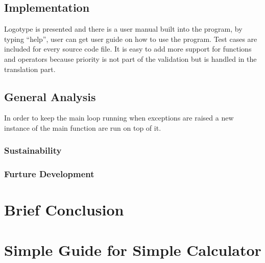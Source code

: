 \documentclass[12pt,a4paper]{article}
\begin{document}
\iffalse
Smarta lösningar (algoritmer)
- Beskriv viktiga funktioner Designval
- Finns alternativa sätt att lösa problemet? Varför valde du det här sättet?
- Konsekvenser av dina val

\fi

\subsection{Implementation}
\textnormal{Logotype is presented and there is a user manual built into the program, by typing “help”, user can get user guide on how to use the program. \newline \newline Test cases are included for every source code file. \newline \newline It is easy to add more support for functions and operators because priority is not part of the validation but is handled in the translation part.}


\iffalse

- Intressanta detaljer
- Fungerar programmet? Hur vet du det?
- Finns det saker som inte fungerar, fall som inte hanteras?
- Ãr programmet effektivt?
\fi

\subsection{General Analysis}
\textnormal{In order to keep the main loop running when exceptions are raised a new instance of the main function are run on top of it.}
\iffalse
Analys/diskussion
- Vilka Ãr systemets styrkor/svagheter? -> Sustainability
- Blev det bra? Skulle du ha gjort något annorlunda om du skulle börja om? -> Sustainability
- Tänkbara vidareutvecklingar -> Furture Development
\fi

\subsubsection{Sustainability}
\textnormal{}

\subsubsection{Furture Development}
\textnormal{}

\section{Brief Conclusion}
\textnormal{}
\iffalse
- Avslutning: Sammanfattning, diskussion, slutsatser
\fi

\section{Simple Guide for Simple Calculator}
\textnormal{}
\iffalse
- Användarhandledning med exempel (use cases)
\fi



\begin{thebibliography}{breitestes Label}
\bibitem{}
  \emph{}
	
\bibitem{}
	
\end{thebibliography}
\end{document}
